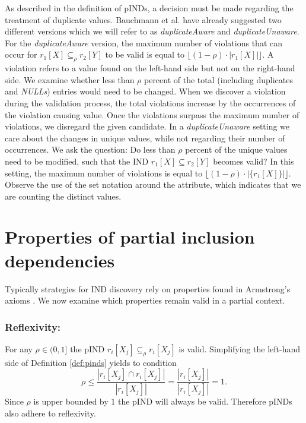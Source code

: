 As described in the definition of pINDs, a decision must be made regarding the treatment of duplicate values. Bauchmann et al. have already suggested two different versions \cite{bauckmann2006efficiently} which we will refer to as \textit{duplicateAware} and \textit{duplicateUnaware}.
For the \textit{duplicateAware} version, the maximum number of violations that can occur for $r_1[X] \subseteq_{\rho} r_2[Y]$ to be valid is equal to $\lfloor (1-\rho) \cdot |r_1[X]| \rfloor$. A violation refers to a value found on the left-hand side but not on the right-hand side. We examine whether less than $\rho$ percent of the total (including duplicates and \textit{NULLs}) entries would need to be changed. When we discover a violation during the validation process, the total violations increase by the occurrences of the violation causing value. Once the violations surpass the maximum number of violations, we disregard the given candidate. In a \textit{duplicateUnaware} setting we care about the changes in unique values, while not regarding their number of occurrences. We ask the question: Do less than $\rho$ percent of the unique values need to be modified, such that the IND $r_1[X] \subseteq r_2[Y]$ becomes valid? In this setting, the maximum number of violations is equal to $\lfloor(1-\rho) \cdot |\{r_1[X]\}| \rfloor$. Observe the use of the set notation around the attribute, which indicates that we are counting the distinct values. \\

\section{Properties of partial inclusion dependencies}\label{subsec:pIND_props}
Typically strategies for IND discovery rely on properties found in Armstrong's axioms \cite{armstrong2002armstrong}. We now examine which properties remain valid in a partial context. 

\subsubsection{\textbf{Reflexivity:}}
For any $\rho \in (0, 1]$ the pIND $r_i[X_j] \subseteq_{\rho} r_i[X_j]$ is valid. Simplifying the left-hand side of Definition \ref{def:pinds} yields to condition
$$
    \rho \leq \frac{|r_i[X_j] \cap r_i[X_j]|}
        {|r_i[X_j]|} = \frac{|r_i[X_j]|}
        {|r_i[X_j]|} = 1.
$$
Since $\rho$ is upper bounded by $1$ the pIND will always be valid. Therefore pINDs also adhere to reflexivity.

